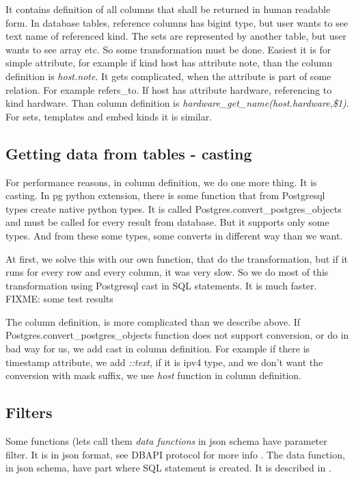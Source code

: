 \documentclass[deska]{subfiles}
\begin{document}
It contains definition of all columns that shall be returned in human readable form.
In database tables, reference columns has bigint type, but user wants to see text name of referenced kind.
The sets are represented by another table, but user wants to see array etc. So some transformation must be done.
Easiest it is for simple attribute,
for example if kind host has attribute note, than the column definition is {\em host.note}.
It gets complicated, when the attribute is part of some relation. For example refers\_to.
If host has attribute hardware, referencing to kind hardware. Than column definition is 
{\em hardware\_get\_name(host.hardware,\$1)}. For sets, templates and embed kinds it is similar.

\subsection{Getting data from tables - casting}
\label{sec:cast}
For performance reasons, in column definition, we do one more thing. It is casting.
In pg python extension, there is some function that from Postgresql types create native python types.
It is called Postgres.convert\_postgres\_objects
and must be called for every result from database. But it supports only some types.
And from these some types, some converts in different way than we want.

At first, we solve this with our own function, that do the transformation, but if it runs for every
row and every column, it was very slow. So we do most of this transformation using Postgresql cast
in SQL statements. It is much faster.
FIXME: some test results

The column definition, is more complicated than we describe above. If
Postgres.convert\_postgres\_objects function 
does not support conversion, or do in bad way for us, we add cast in column definition.
For example if there is timestamp attribute, we add {\em ::text}, if it is ipv4 type, and we don't want
the conversion with mask suffix, we use {\em host} function in column definition.


\subsection{Filters}

Some functions (lets call them {\em data functions} in json schema have parameter filter. It is in json format,
see DBAPI protocol for more info .
The data function, in json schema, have part where SQL statement is created. It is described in
.
\end{document}
